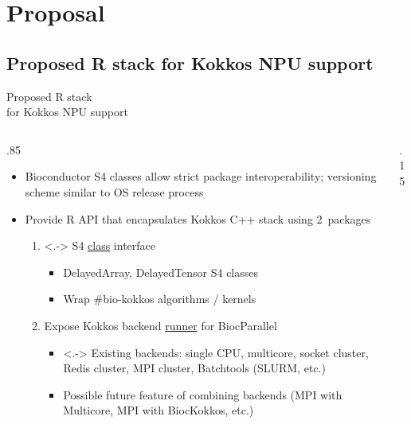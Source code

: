 \documentclass[
aspectratio=169,
xcolor={usenames}
]{beamer}
\begin{document}
\section{Proposal}

\subsection{Proposed R stack for Kokkos NPU support}
\begin{frame}{\hspace{8cm}Proposed R stack\\%
    \hspace{8cm}for Kokkos NPU support}
  \begin{columns}[T]
    \begin{column}{.85\framewidth}
      \begin{itemize}[<+->]
      \item Bioconductor S4 classes %
        allow strict package interoperability; %
        versioning scheme similar to OS release process
      \item Provide R API that encapsulates Kokkos C++ stack using 2~packages
        \begin{enumerate}
        \item<.-> S4 \ul{class} interface
          \begin{itemize}[<.->]
          \item DelayedArray, DelayedTensor S4 classes
          \item Wrap \#bio-kokkos algorithms / kernels
          \end{itemize}
        \item Expose Kokkos backend \ul{runner} for BiocParallel
          \begin{itemize}
          \item<.-> Existing backends: %
            single CPU, %
            multicore, %
            socket cluster, %
            Redis cluster, %
            MPI cluster, %
            Batchtools (SLURM, etc.)
          \item Possible future feature of combining backends %
            (MPI with Multicore, MPI with BiocKokkos, etc.)
          \end{itemize}
        \end{enumerate}
      \end{itemize}
    \end{column}
    \begin{column}{.15\framewidth}
      \begin{tikzpicture}[%
        every node/.style = {
          inner sep = 0pt,
          outer sep = 0pt
        }
        ]

\end{tikzpicture}
\end{column}
\end{columns}
\end{frame}
\end{document}
